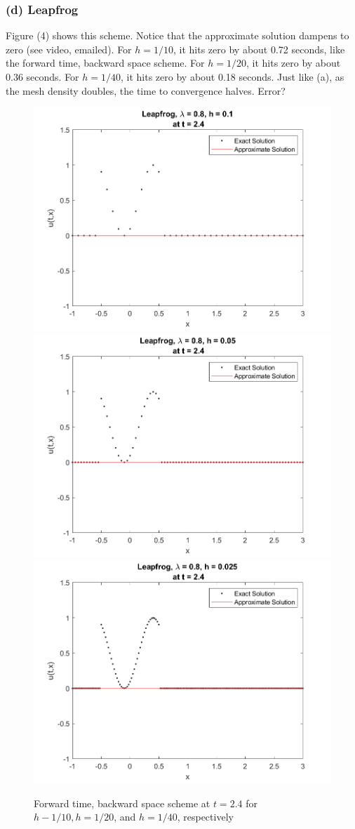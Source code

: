 \documentclass[12pt]{article}
\begin{document}
\subsubsection*{(d) Leapfrog}

Figure (4) shows this scheme. Notice that the approximate solution dampens to zero (see video, emailed). For $h=1/10$, it hits zero by about 0.72 seconds, like the forward time, backward space scheme. For $h=1/20$, it hits zero by about 0.36 seconds. For $h=1/40$, it hits zero by about 0.18 seconds. Just like (a), as the mesh density doubles, the time to convergence halves. Error? 

\begin{figure}
	\centering
	\includegraphics[width=.6\linewidth]{./code/d_leapfrog_h_one_10th.png}	\includegraphics[width=.6\linewidth]{./code/d_leapfrog_h_one_20th.png}
	\includegraphics[width=.6\linewidth]{./code/d_leapfrog_h_one_40th.png}
	\caption{Forward time, backward space scheme at $t=2.4$ for $h-1/10, h=1/20$, and $h=1/40$, respectively}
\end{figure}
\end{document}
